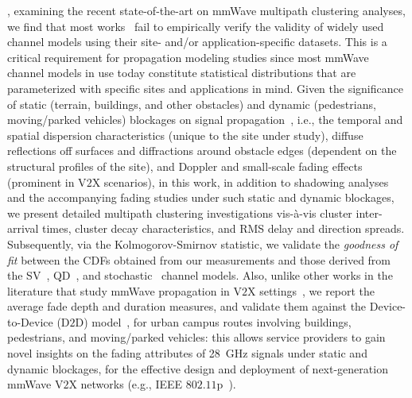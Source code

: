 \documentclass[10pt, twocolumn]{IEEEtran}
\begin{document}
, examining the recent state-of-the-art on mmWave multipath clustering analyses, we find that most works~\cite{Outdoor28G, PDAPs, D2DHumanBlockage, DopplerHST, V2XBlockages, MacCartneyUrbanHumanBlockage} fail to empirically verify the validity of widely used channel models using their site- and/or application-specific datasets. This is a critical requirement for propagation modeling studies since most mmWave channel models in use today constitute statistical distributions that are parameterized with specific sites and applications in mind. Given the significance of static (terrain, buildings, and other obstacles) and dynamic (pedestrians, moving/parked vehicles) blockages on signal propagation~\cite{Rappaport}, i.e., the temporal and spatial dispersion characteristics (unique to the site under study), diffuse reflections off surfaces and diffractions around obstacle edges (dependent on the structural profiles of the site), and Doppler and small-scale fading effects (prominent in V$2$X scenarios), in this work, in addition to shadowing analyses and the accompanying fading studies under such static and dynamic blockages, we present detailed multipath clustering investigations vis-\`{a}-vis cluster inter-arrival times, cluster decay characteristics, and RMS delay and direction spreads. Subsequently, via the Kolmogorov-Smirnov statistic, we validate the \emph{goodness of fit} between the CDFs obtained from our measurements and those derived from the SV~\cite{SV_Molisch}, QD~\cite{QDC_NIST}, and stochastic~\cite{Indoor60G} channel models. Also, unlike other works in the literature that study mmWave propagation in V$2$X settings~\cite{DopplerHST, V2XBlockages, MacCartneyUrbanHumanBlockage}, we report the average fade depth and duration measures, and validate them against the Device-to-Device (D$2$D) model~\cite{D2DHumanBlockage}, for urban campus routes involving buildings, pedestrians, and moving/parked vehicles: this allows service providers to gain novel insights on the fading attributes of \SI{28}{\giga\hertz} signals under static and dynamic blockages, for the effective design and deployment of next-generation mmWave V$2$X networks (e.g., IEEE $802.11$p~\cite{802.11p}).
\end{document}
